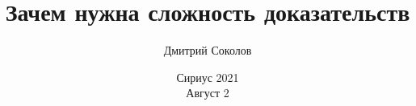

\titlegraphic{
    
}


\title[Сложность доказательств]{
    Зачем нужна сложность доказательств
}

\author[Соколов Д.]{
    Дмитрий Соколов
}  


\date{Сириус 2021\\ Август 2}





    \maketitle

    
    
    
    
    

